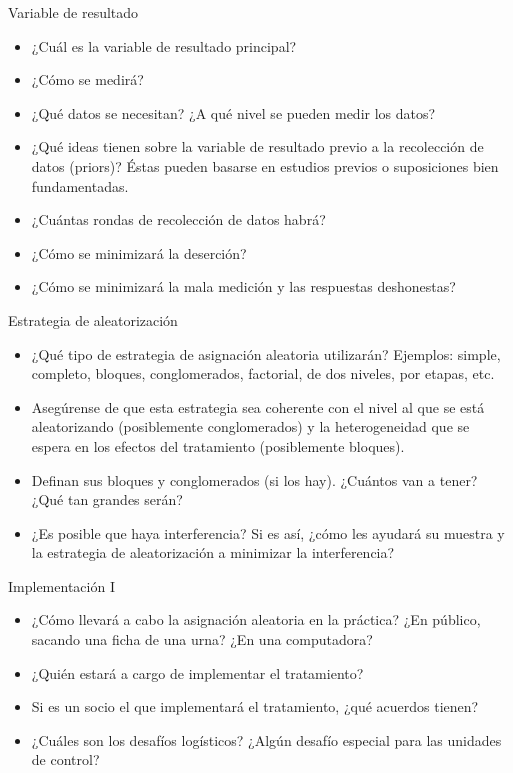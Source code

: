 \documentclass[
  ignorenonframetext,
]{beamer}
\begin{document}
\begin{frame}{Variable de resultado}
\protect\hypertarget{variable-de-resultado}{}
\begin{itemize}
\item
  ¿Cuál es la variable de resultado principal?
\item
  ¿Cómo se medirá?
\item
  ¿Qué datos se necesitan? ¿A qué nivel se pueden medir los datos?
\item
  ¿Qué ideas tienen sobre la variable de resultado previo a la
  recolección de datos (priors)? Éstas pueden basarse en estudios
  previos o suposiciones bien fundamentadas.
\item
  ¿Cuántas rondas de recolección de datos habrá?
\item
  ¿Cómo se minimizará la deserción?
\item
  ¿Cómo se minimizará la mala medición y las respuestas deshonestas?
\end{itemize}
\end{frame}

\begin{frame}{Estrategia de aleatorización}
\protect\hypertarget{estrategia-de-aleatorizaciuxf3n}{}
\begin{itemize}
\item
  ¿Qué tipo de estrategia de asignación aleatoria utilizarán? Ejemplos:
  simple, completo, bloques, conglomerados, factorial, de dos niveles,
  por etapas, etc.
\item
  Asegúrense de que esta estrategia sea coherente con el nivel al que se
  está aleatorizando (posiblemente conglomerados) y la heterogeneidad
  que se espera en los efectos del tratamiento (posiblemente bloques).
\item
  Definan sus bloques y conglomerados (si los hay). ¿Cuántos van a
  tener? ¿Qué tan grandes serán?
\item
  ¿Es posible que haya interferencia? Si es así, ¿cómo les ayudará su
  muestra y la estrategia de aleatorización a minimizar la
  interferencia?
\end{itemize}
\end{frame}

\begin{frame}{Implementación I}
\protect\hypertarget{implementaciuxf3n-i}{}
\begin{itemize}
\item
  ¿Cómo llevará a cabo la asignación aleatoria en la práctica? ¿En
  público, sacando una ficha de una urna? ¿En una computadora?
\item
  ¿Quién estará a cargo de implementar el tratamiento?
\item
  Si es un socio el que implementará el tratamiento, ¿qué acuerdos
  tienen?
\item
  ¿Cuáles son los desafíos logísticos? ¿Algún desafío especial para las
  unidades de control?
\end{itemize}
\end{frame}
\end{document}
